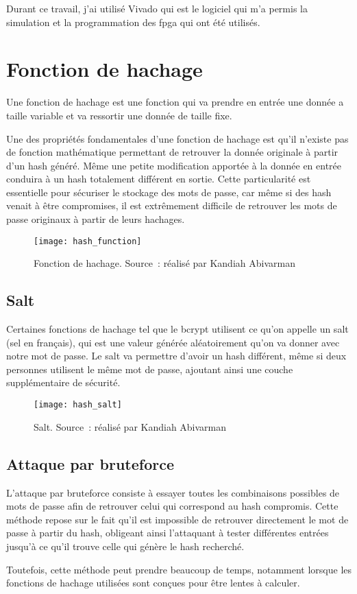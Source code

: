 Durant ce travail, j'ai utilisé Vivado qui est le logiciel qui m'a permis la simulation et la programmation des \gls{fpga} qui ont été utilisés. 

\newpage

\section{Fonction de hachage}

Une fonction de hachage est une fonction qui va prendre en entrée une donnée a taille variable et va ressortir une donnée de taille fixe. 

Une des propriétés fondamentales d'une fonction de hachage est qu'il n'existe pas de fonction mathématique permettant de retrouver la donnée originale à partir d'un hash généré. 
Même une petite modification apportée à la donnée en entrée conduira à un hash totalement différent en sortie. 
Cette particularité est essentielle pour sécuriser le stockage des mots de passe, car même si des hash venait à être compromises, il est extrêmement difficile de retrouver les mots de passe originaux à partir de leurs hachages.


\begin{figure}[tbph!]
	\centering
	\texttt{[image: hash\_function]}
	\caption[Fonction de hachage]{Fonction de hachage. Source : réalisé par Kandiah Abivarman}
	\label{fig:fonction_hachage}
\end{figure}


\subsection{Salt}

Certaines fonctions de hachage tel que le bcrypt utilisent ce qu'on appelle un salt (sel en français), qui est une valeur générée aléatoirement qu'on va donner avec notre mot de passe. Le salt va permettre d'avoir un hash différent, même si deux personnes utilisent le même mot de passe, ajoutant ainsi une couche supplémentaire de sécurité.

\begin{figure}[tbph!]
	\centering
	\texttt{[image: hash\_salt]}
	\caption[Salt]{Salt. Source : réalisé par Kandiah Abivarman}
	\label{fig:hash_salt}
\end{figure}

\newpage

\subsection{Attaque par bruteforce}

L'attaque par bruteforce consiste à essayer toutes les combinaisons possibles de mots de passe afin de retrouver celui qui correspond au hash compromis. Cette méthode repose sur le fait qu'il est impossible de retrouver directement le mot de passe à partir du hash, obligeant ainsi l'attaquant à tester différentes entrées jusqu'à ce qu'il trouve celle qui génère le hash recherché.

Toutefois, cette méthode peut prendre beaucoup de temps, notamment lorsque les fonctions de hachage utilisées sont conçues pour être lentes à calculer.